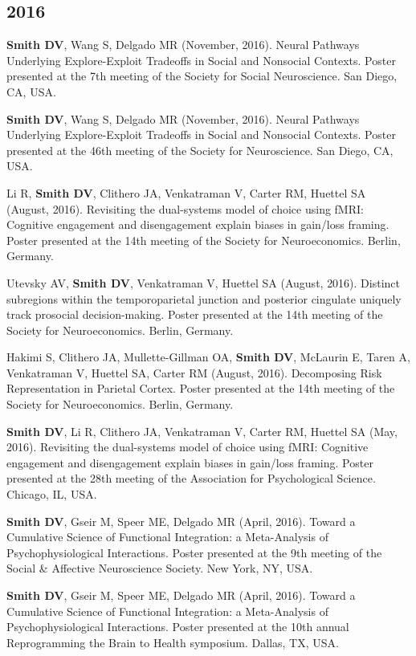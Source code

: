 \documentclass[11pt, letterpaper]{article}
\begin{document}
\subsection*{2016}
\begin{hangparas}{.5in}{1}
\textbf{Smith DV}, Wang S, Delgado MR (November, 2016). Neural Pathways Underlying Explore-Exploit Tradeoffs in Social and Nonsocial Contexts. Poster presented at the 7th meeting of the Society for Social Neuroscience. San Diego, CA, USA.

\textbf{Smith DV}, Wang S, Delgado MR (November, 2016). Neural Pathways Underlying Explore-Exploit Tradeoffs in Social and Nonsocial Contexts. Poster presented at the 46th meeting of the Society for Neuroscience. San Diego, CA, USA.

Li R, \textbf{Smith DV}, Clithero JA, Venkatraman V, Carter RM, Huettel SA (August, 2016). Revisiting the dual-systems model of choice using fMRI: Cognitive engagement and disengagement explain biases in gain/loss framing. Poster presented at the 14th meeting of the Society for Neuroeconomics. Berlin, Germany.

Utevsky AV, \textbf{Smith DV}, Venkatraman V, Huettel SA (August, 2016). Distinct subregions within the temporoparietal junction and posterior cingulate uniquely track prosocial decision-making. Poster presented at the 14th meeting of the Society for Neuroeconomics. Berlin, Germany.

Hakimi S, Clithero JA, Mullette-Gillman OA, \textbf{Smith DV}, McLaurin E, Taren A, Venkatraman V, Huettel SA, Carter RM (August, 2016). Decomposing Risk Representation in Parietal Cortex. Poster presented at the 14th meeting of the Society for Neuroeconomics. Berlin, Germany.

\textbf{Smith DV}, Li R, Clithero JA, Venkatraman V, Carter RM, Huettel SA (May, 2016). Revisiting the dual-systems model of choice using fMRI: Cognitive engagement and disengagement explain biases in gain/loss framing. Poster presented at the 28th meeting of the Association for Psychological Science. Chicago, IL, USA.

\textbf{Smith DV}, Gseir M, Speer ME, Delgado MR (April, 2016). Toward a Cumulative Science of Functional Integration: a Meta-Analysis of Psychophysiological Interactions. Poster presented at the 9th meeting of the Social \& Affective Neuroscience Society. New York, NY, USA.

\textbf{Smith DV}, Gseir M, Speer ME, Delgado MR (April, 2016). Toward a Cumulative Science of Functional Integration: a Meta-Analysis of Psychophysiological Interactions. Poster presented at the 10th annual Reprogramming the Brain to Health symposium. Dallas, TX, USA. \\

\end{hangparas}
\end{document}

